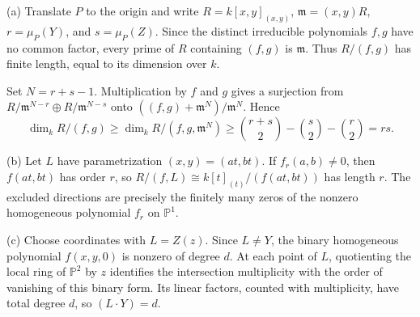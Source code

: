 (a) Translate $P$ to the origin and write $R=k[x,y]_{(x,y)}$, $\mathfrak m=(x,y)R$, $r=\mu_P(Y)$, and $s=\mu_P(Z)$. Since the distinct irreducible polynomials $f,g$ have no common factor, every prime of $R$ containing $(f,g)$ is $\mathfrak m$. Thus $R/(f,g)$ has finite length, equal to its dimension over $k$.

Set $N=r+s-1$. Multiplication by $f$ and $g$ gives a surjection from $R/\mathfrak m^{N-r}\oplus R/\mathfrak m^{N-s}$ onto $((f,g)+\mathfrak m^N)/\mathfrak m^N$. Hence
\[\dim_k R/(f,g)\geq\dim_k R/(f,g,\mathfrak m^N)\geq\binom{r+s}{2}-\binom{s}{2}-\binom{r}{2}=rs.\]

(b) Let $L$ have parametrization $(x,y)=(at,bt)$. If $f_r(a,b)\ne0$, then $f(at,bt)$ has order $r$, so $R/(f,L)\cong k[t]_{(t)}/(f(at,bt))$ has length $r$. The excluded directions are precisely the finitely many zeros of the nonzero homogeneous polynomial $f_r$ on $\mathbb{P}^1$.

(c) Choose coordinates with $L=Z(z)$. Since $L\ne Y$, the binary homogeneous polynomial $f(x,y,0)$ is nonzero of degree $d$. At each point of $L$, quotienting the local ring of $\mathbb{P}^2$ by $z$ identifies the intersection multiplicity with the order of vanishing of this binary form. Its linear factors, counted with multiplicity, have total degree $d$, so $(L\cdot Y)=d$.
